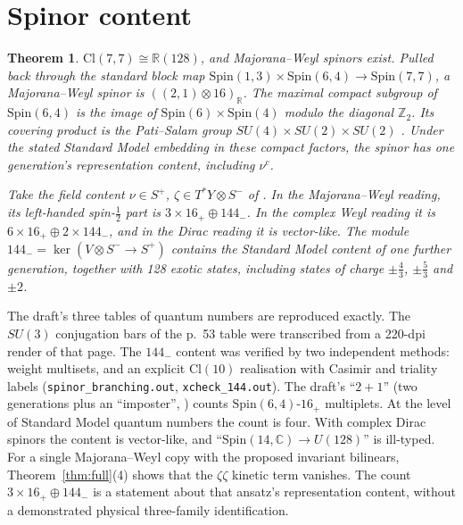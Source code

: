 \documentclass[11pt]{article}
\newtheorem{theorem}{Theorem}
\theoremstyle{remark}
\begin{document}
\section{Spinor content}
\begin{theorem}
$\mathrm{Cl}(7,7)\cong\mathbb R(128)$, and Majorana--Weyl spinors exist. Pulled back through the standard block map $\mathrm{Spin}(1,3)\times\mathrm{Spin}(6,4)\to\mathrm{Spin}(7,7)$, a Majorana--Weyl spinor is $((2,1)\otimes16)_{\mathbb R}$.
The maximal compact subgroup of $\mathrm{Spin}(6,4)$ is the image of $\mathrm{Spin}(6)\times\mathrm{Spin}(4)$ modulo the diagonal $\mathbb Z_2$. Its covering product is the Pati--Salam group $SU(4)\times SU(2)\times SU(2)$ \cite{BH}. Under the stated Standard Model embedding in these compact factors, the spinor has one generation's representation content, including $\nu^c$.

Take the field content $\nu\in S^+$, $\zeta\in T^*Y\otimes S^-$ of \cite[(12.28)]{W21}. In the Majorana--Weyl reading, its left-handed spin-$\tfrac12$ part is $3\times16_+\oplus144_-$. In the complex Weyl reading it is $6\times16_+\oplus2\times144_-$, and in the Dirac reading it is vector-like. The module $144_-=\ker(V\otimes S^-\to S^+)$ contains the Standard Model content of one further generation, together with 128 exotic states, including states of charge $\pm\tfrac43$, $\pm\tfrac53$ and $\pm2$.
\end{theorem}
The draft's three tables of quantum numbers \cite[pp.~52--53]{W21} are reproduced exactly. The $SU(3)$ conjugation bars of the p.~53 table were transcribed from a 220-dpi render of that page. The $144_-$ content was verified by two independent methods: weight multisets, and an explicit $\mathrm{Cl}(10)$ realisation with Casimir and triality labels (\texttt{spinor\_branching.out}, \texttt{xcheck\_144.out}). The draft's ``$2+1$'' (two generations plus an ``imposter'', \cite[(12.22), p.~62]{W21}) counts $\mathrm{Spin}(6,4)$-$16_+$ multiplets. At the level of Standard Model quantum numbers the count is four. With complex Dirac spinors the content is vector-like, and ``$\mathrm{Spin}(14,\mathbb C)\to U(128)$'' \cite[(3.20)]{W21} is ill-typed. For a single Majorana--Weyl copy with the proposed invariant bilinears, Theorem~\ref{thm:full}(4) shows that the $\zeta\zeta$ kinetic term vanishes. The count $3\times16_+\oplus144_-$ is a statement about that ansatz's representation content, without a demonstrated physical three-family identification.
\end{document}
